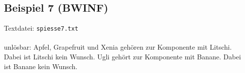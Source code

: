 \subsection{Beispiel 7 (BWINF)}\label{example:7}
Textdatei: \texttt{spiesse7.txt}\\

\noindent
{}\\

unlösbar: Apfel, Grapefruit und Xenia gehören zur Komponente mit Litschi. Dabei ist Litschi kein Wunsch.
Ugli gehört zur Komponente mit Banane. Dabei ist Banane kein Wunsch.
